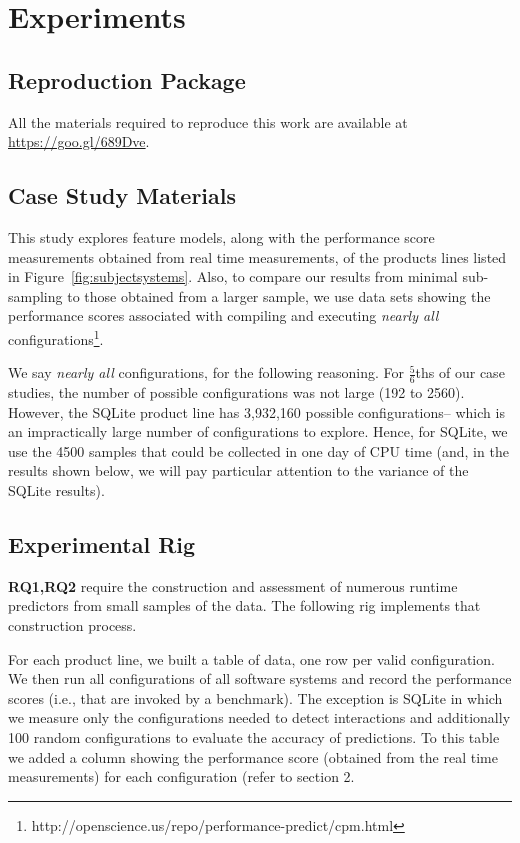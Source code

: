 \documentclass{sig-alternative}
\newcommand{\fig}[1]{Figure~\ref{fig:#1}}
\begin{document}
\section{Experiments}

\subsection{Reproduction Package}

All the materials required to reproduce this work are available at \url{https://goo.gl/689Dve}.

\subsection{Case Study Materials}

This study explores feature models, along with the performance score measurements obtained from real time measurements, of the products lines listed in \fig{subjectsystems}.
Also, to compare our results from minimal sub-sampling to those obtained 
from a larger sample, we use data sets showing the performance scores associated with
compiling and executing {\em nearly all} configurations\footnote{http://openscience.us/repo/performance-predict/cpm.html}.

We say {\em nearly all} configurations, for the following reasoning. For 
$\frac{5}{6}$ths of our case studies, the number of possible configurations
was not large (192 to 2560). However, the SQLite product line has 3,932,160 
possible configurations-- which is an impractically large number of configurations to explore. Hence, for SQLite, we use the 4500 samples that could
be collected in one day of CPU time (and, in the results shown below,
we will pay particular attention to the variance of the SQLite results).

\subsection{Experimental Rig}


{\bf RQ1,RQ2} require the construction and assessment of numerous runtime predictors from small samples
of the data. The following rig implements that construction process.

For each product line, we built a table of data, one row per valid configuration. We then run all configurations of all software systems
and record the performance scores (i.e., that are invoked by a benchmark).
The exception is SQLite in which we measure only the
configurations needed to detect interactions and additionally
100 random configurations to evaluate the accuracy of
predictions.  
To this table we added a column showing the performance score (obtained from the real time measurements) for each configuration (refer to section 2.
\end{document}
